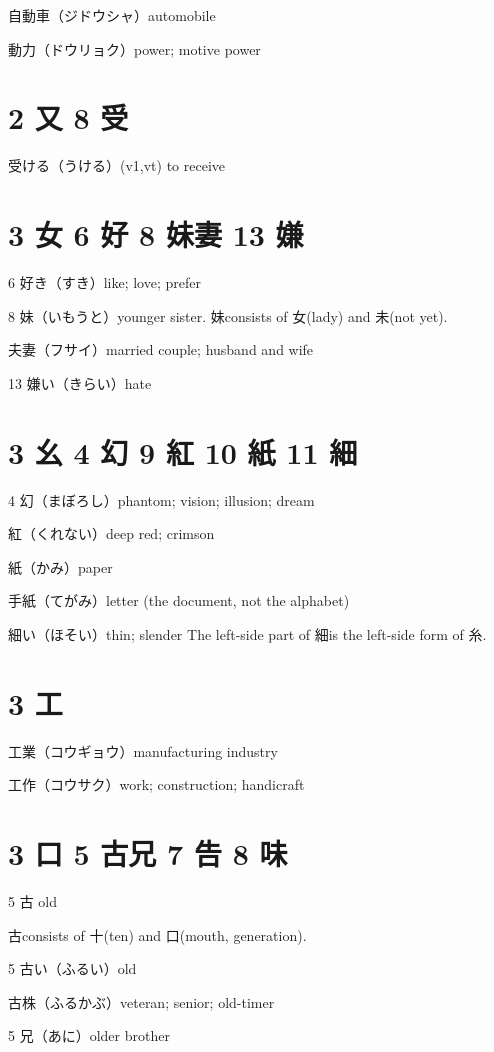 自動車（ジドウシャ）automobile

動力（ドウリョク）power; motive power

\section{2 又 8 受}

受ける（うける）(v1,vt) to receive

\section{3 女 6 好 8 妹妻 13 嫌}

6 好き（すき）like; love; prefer

8 妹（いもうと）younger sister.
妹consists of 女(lady) and 未(not yet).

夫妻（フサイ）married couple; husband and wife

13 嫌い（きらい）hate

\section{3 幺 4 幻 9 紅 10 紙 11 細}

4 幻（まぼろし）phantom; vision; illusion; dream

紅（くれない）deep red; crimson

紙（かみ）paper

手紙（てがみ）letter (the document, not the alphabet)

細い（ほそい）thin; slender
The left-side part of 細is the left-side form of 糸.

\section{3 工}

工業（コウギョウ）manufacturing industry

工作（コウサク）work; construction; handicraft

\section{3 口 5 古兄 7 告 8 味}

5 古 old

古consists of 十(ten) and 口(mouth, generation).

5 古い（ふるい）old

古株（ふるかぶ）veteran; senior; old-timer

5 兄（あに）older brother

